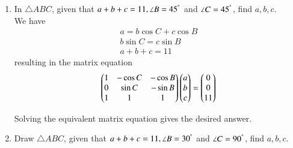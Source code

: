 \documentclass[journal,12pt,twocolumn]{IEEEtran}
\renewcommand\thesection{\arabic{section}}
\begin{document}
\begin{enumerate}[label=\thesection.\arabic*
,ref=\thesection.\theenumi]
%
\item In $\triangle ABC$,  given that $a+b+c = 11, \angle B = 45^{\degree}$ and $\angle C = 45^{\degree}$, 
find 
$a,b,c$.
\\
\solution We have
\begin{align}
a = b \cos C + c \cos B
\\
b \sin C = c \sin B
\\
a + b+c = 11
\end{align}
%
resulting  in the matrix equation 
\begin{align}
\begin{pmatrix}
1 & -\cos C & - \cos B
\\
0 & \sin C &- \sin B
\\
1 & 1 & 1
\end{pmatrix}
\begin{pmatrix}a \\b\\c\end{pmatrix} = \begin{pmatrix}0 \\ 0 \\ 11\end{pmatrix}
\end{align}

Solving the equivalent matrix equation gives the desired answer.
\item Draw $\triangle ABC$,  given that $a+b+c = 11, \angle B = 30^{\degree}$ and $\angle C = 90^{\degree}$, 
find 
$a,b,c$.
\end{enumerate}
\end{document}
